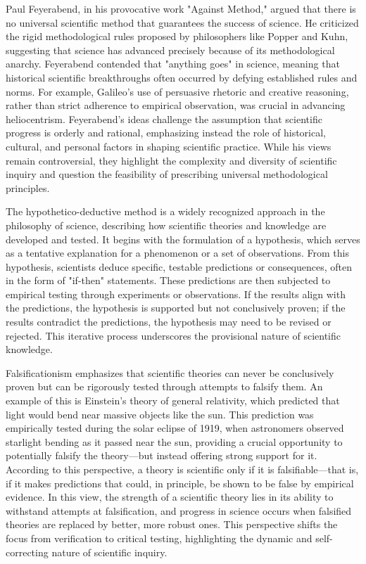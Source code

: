 Paul Feyerabend, in his provocative work "Against Method," argued that there is no universal scientific method that guarantees the success of science. He criticized the rigid methodological rules proposed by philosophers like Popper and Kuhn, suggesting that science has advanced precisely because of its methodological anarchy. Feyerabend contended that "anything goes" in science, meaning that historical scientific breakthroughs often occurred by defying established rules and norms. For example, Galileo's use of persuasive rhetoric and creative reasoning, rather than strict adherence to empirical observation, was crucial in advancing heliocentrism. Feyerabend's ideas challenge the assumption that scientific progress is orderly and rational, emphasizing instead the role of historical, cultural, and personal factors in shaping scientific practice. While his views remain controversial, they highlight the complexity and diversity of scientific inquiry and question the feasibility of prescribing universal methodological principles.

The hypothetico-deductive method is a widely recognized approach in the philosophy of science, describing how scientific theories and knowledge are developed and tested. It begins with the formulation of a hypothesis, which serves as a tentative explanation for a phenomenon or a set of observations. From this hypothesis, scientists deduce specific, testable predictions or consequences, often in the form of "if-then" statements. These predictions are then subjected to empirical testing through experiments or observations. If the results align with the predictions, the hypothesis is supported but not conclusively proven; if the results contradict the predictions, the hypothesis may need to be revised or rejected. This iterative process underscores the provisional nature of scientific knowledge.

Falsificationism emphasizes that scientific theories can never be conclusively proven but can be rigorously tested through attempts to falsify them. An example of this is Einstein's theory of general relativity, which predicted that light would bend near massive objects like the sun. This prediction was empirically tested during the solar eclipse of 1919, when astronomers observed starlight bending as it passed near the sun, providing a crucial opportunity to potentially falsify the theory—but instead offering strong support for it. According to this perspective, a theory is scientific only if it is falsifiable—that is, if it makes predictions that could, in principle, be shown to be false by empirical evidence. In this view, the strength of a scientific theory lies in its ability to withstand attempts at falsification, and progress in science occurs when falsified theories are replaced by better, more robust ones. This perspective shifts the focus from verification to critical testing, highlighting the dynamic and self-correcting nature of scientific inquiry.

